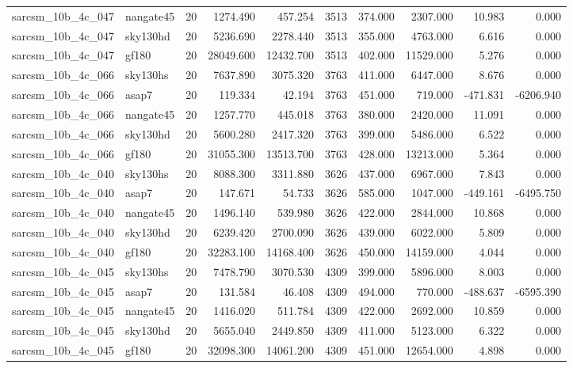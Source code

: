 \begin{longtable}{llrrrrrrrr}
sarcsm\_10b\_4c\_047 & nangate45 & 20 & 1274.490 & 457.254 & 3513 & 374.000 & 2307.000 & 10.983 & 0.000 \\
sarcsm\_10b\_4c\_047 & sky130hd & 20 & 5236.690 & 2278.440 & 3513 & 355.000 & 4763.000 & 6.616 & 0.000 \\
sarcsm\_10b\_4c\_047 & gf180 & 20 & 28049.600 & 12432.700 & 3513 & 402.000 & 11529.000 & 5.276 & 0.000 \\
sarcsm\_10b\_4c\_066 & sky130hs & 20 & 7637.890 & 3075.320 & 3763 & 411.000 & 6447.000 & 8.676 & 0.000 \\
sarcsm\_10b\_4c\_066 & asap7 & 20 & 119.334 & 42.194 & 3763 & 451.000 & 719.000 & -471.831 & -6206.940 \\
sarcsm\_10b\_4c\_066 & nangate45 & 20 & 1257.770 & 445.018 & 3763 & 380.000 & 2420.000 & 11.091 & 0.000 \\
sarcsm\_10b\_4c\_066 & sky130hd & 20 & 5600.280 & 2417.320 & 3763 & 399.000 & 5486.000 & 6.522 & 0.000 \\
sarcsm\_10b\_4c\_066 & gf180 & 20 & 31055.300 & 13513.700 & 3763 & 428.000 & 13213.000 & 5.364 & 0.000 \\
sarcsm\_10b\_4c\_040 & sky130hs & 20 & 8088.300 & 3311.880 & 3626 & 437.000 & 6967.000 & 7.843 & 0.000 \\
sarcsm\_10b\_4c\_040 & asap7 & 20 & 147.671 & 54.733 & 3626 & 585.000 & 1047.000 & -449.161 & -6495.750 \\
sarcsm\_10b\_4c\_040 & nangate45 & 20 & 1496.140 & 539.980 & 3626 & 422.000 & 2844.000 & 10.868 & 0.000 \\
sarcsm\_10b\_4c\_040 & sky130hd & 20 & 6239.420 & 2700.090 & 3626 & 439.000 & 6022.000 & 5.809 & 0.000 \\
sarcsm\_10b\_4c\_040 & gf180 & 20 & 32283.100 & 14168.400 & 3626 & 450.000 & 14159.000 & 4.044 & 0.000 \\
sarcsm\_10b\_4c\_045 & sky130hs & 20 & 7478.790 & 3070.530 & 4309 & 399.000 & 5896.000 & 8.003 & 0.000 \\
sarcsm\_10b\_4c\_045 & asap7 & 20 & 131.584 & 46.408 & 4309 & 494.000 & 770.000 & -488.637 & -6595.390 \\
sarcsm\_10b\_4c\_045 & nangate45 & 20 & 1416.020 & 511.784 & 4309 & 422.000 & 2692.000 & 10.859 & 0.000 \\
sarcsm\_10b\_4c\_045 & sky130hd & 20 & 5655.040 & 2449.850 & 4309 & 411.000 & 5123.000 & 6.322 & 0.000 \\
sarcsm\_10b\_4c\_045 & gf180 & 20 & 32098.300 & 14061.200 & 4309 & 451.000 & 12654.000 & 4.898 & 0.000 \\

\end{longtable}
